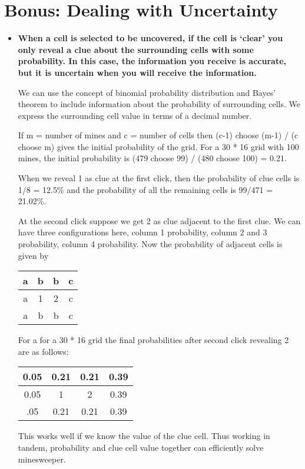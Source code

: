 \section{\textbf{Bonus: Dealing with Uncertainty}}
\begin{itemize}
\item 
\textbf{When a cell is selected to be uncovered, if the cell is `clear' you only reveal a clue about the surrounding cells
with some probability. In this case, the information you receive is accurate, but it is uncertain when you will
receive the information.}

We can use the concept of binomial probability distribution and Bayes' theorem to include information about the probability of surrounding cells. We express the surrounding cell value in terms of a decimal number.

If m = number of mines and c = number of cells then (c-1) choose (m-1) / (c choose m) gives the initial probability of the grid. For a 30 * 16 grid with 100 mines, the initial probability is (479 choose 99) / (480 choose 100) = 0.21.

When we reveal 1 as clue at the first click, then the probability of clue cells is 1/8 = 12.5\% and the probability of all the remaining cells is 99/471 = 21.02\%.

At the second click suppose we get 2 as clue adjacent to the first clue. We can have three configurations here, column 1 probability, column 2 and 3 probability, column 4 probability. 
Now the probability of adjacent cells is given by

\begin{tabular}{|c|c|c|c|}
\hline
a & b & b & c\\
\hline
a & 1 & 2 & c\\
\hline
a & b & b & c\\
\hline
\end{tabular}

For a for a 30 * 16 grid the final probabilities after second click revealing 2 are as follows:

\begin{tabular}{|c|c|c|c|}
\hline
0.05 & 0.21 & 0.21 & 0.39\\
\hline
0.05 & 1 & 2 & 0.39\\
\hline
.05 & 0.21 & 0.21 & 0.39\\
\hline
\end{tabular}

This works well if we know the value of the clue cell. Thus working in tandem, probability and clue cell value together can efficiently solve minesweeper.


\end{itemize}
